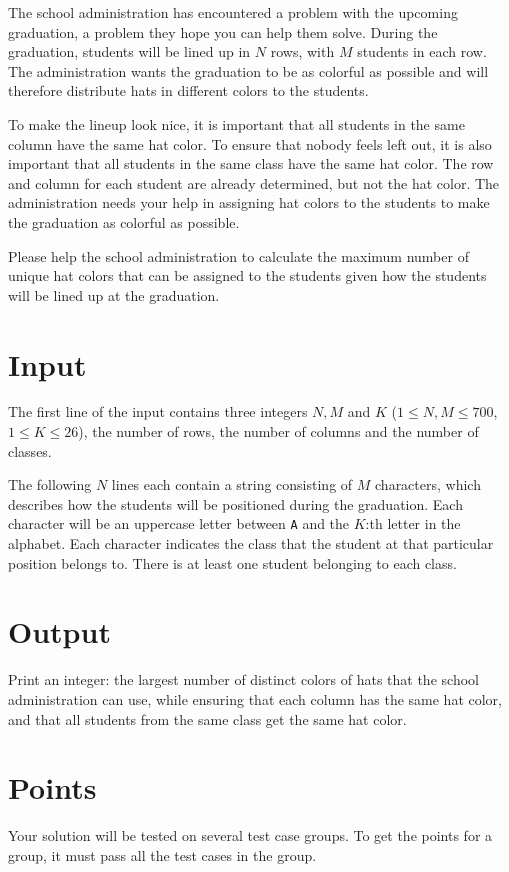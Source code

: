 \noindent
The school administration has encountered a problem with the upcoming graduation, a problem they hope
you can help them solve. During the graduation, students will be lined up in $N$ rows, with $M$ students in each row.
The administration wants the graduation to be as colorful as possible and will therefore distribute hats in
different colors to the students.

To make the lineup look nice, it is important that all students in the same column have the same hat color.
To ensure that nobody feels left out, it is also important that all students in the same class have the same
hat color. The row and column for each student are already determined, but not the hat color. The administration
needs your help in assigning hat colors to the students to make the graduation as colorful as possible.

Please help the school administration to calculate the maximum number of unique hat colors that can be assigned to the students
given how the students will be lined up at the graduation.

\section*{Input}
The first line of the input contains three integers $N, M$ and $K$ ($1 \leq N,M \leq 700$, $1 \leq K \leq 26$),
the number of rows, the number of columns and the number of classes.

The following $N$ lines each contain a string consisting of $M$ characters, which describes how the students
will be positioned during the graduation. Each character will be an uppercase letter between \texttt{A} and the $K$:th
letter in the alphabet. Each character indicates the class that the student at that particular position belongs to. There is at
least one student belonging to each class.

\section*{Output}
Print an integer: the largest number of distinct colors of hats that the school administration can use, while
ensuring that each column has the same hat color, and that all students from the same class get the same hat color.

\section*{Points}
Your solution will be tested on several test case groups.
To get the points for a group, it must pass all the test cases in the group.

